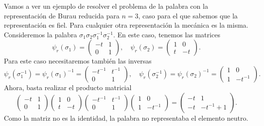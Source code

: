\documentclass[TFG.tex]{subfiles}
\begin{document}
\begin{ej}
Vamos a ver un ejemplo de resolver el problema de la palabra con la representación de Burau reducida para $n=3$, caso para el que sabemos que la representación es fiel. Para cualquier otra representación la mecánica es la misma. Consideremos la palabra $\sigma_1\sigma_2\sigma_1^{-1}\sigma_2^{-1}$. En este caso, tenemos las matrices
\[
\psi_r(\sigma_1)=\begin{pmatrix}
-t&1 \\
0 & 1
\end{pmatrix},\quad \psi_r(\sigma_2)=\begin{pmatrix}
1&0 \\
t&-t
\end{pmatrix}.
\]
Para este caso necesitaremos también las inversas
\[
\psi_r(\sigma_1^{-1})=\psi_r(\sigma_1)^{-1}=\begin{pmatrix}
-t^{-1}&t^{-1} \\
0&1
\end{pmatrix},\quad \psi_r(\sigma_2^{-1})=\psi_r(\sigma_2)^{-1}=\begin{pmatrix}
1&0 \\
1&-t^{-1}
\end{pmatrix}.
\]
Ahora, basta realizar el producto matricial
\[
\begin{pmatrix}
-t&1 \\
0 & 1
\end{pmatrix}\begin{pmatrix}
1&0 \\
t&-t
\end{pmatrix}\begin{pmatrix}
-t^{-1}&t^{-1} \\
0&1
\end{pmatrix}\begin{pmatrix}
1&0 \\
1&-t^{-1}
\end{pmatrix}=
\begin{pmatrix}
-t& 1\\
-t& -t^{-1}+1
\end{pmatrix}.
\]
Como la matriz no es la identidad, la palabra no representaba el elemento neutro.
\end{ej}
\end{document}
